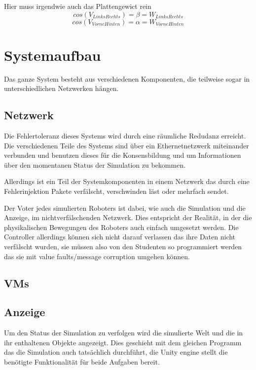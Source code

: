 \documentclass[
    12pt,
    bibliography=totoc,
    ngerman
]{scrartcl}
\begin{document}
Hier muss irgendwie auch das Plattengewict rein
$$ cos(V_{LinksRechts}) = \beta = W_{LinksRechts} $$
$$ cos(V_{VorneHinten}) = \alpha = W_{VorneHinten} $$

\clearpage
\section{Systemaufbau}
Das ganze System besteht aus verschiedenen Komponenten, die teilweise sogar in unterschiedlichen Netzwerken h{\"{a}}ngen. 

\subsection{Netzwerk}\label{network}
Die Fehlertoleranz dieses Systems wird durch eine r{\"{a}}umliche Redudanz erreicht. Die verschiedenen Teile des Systems sind {\"{u}}ber ein Ethernetnetzwerk miteinander verbunden und benutzen dieses
f{\"{u}}r die Konsensbildung und um Informationen {\"{u}}ber den momentanen Status der Simulation zu bekommen.

Allerdings ist ein Teil der Systemkomponenten in einem Netzwerk das durch eine Fehlerinjektion Pakete verf{\"{a}}lscht, verschwinden l{\"{a}}st oder mehrfach sendet. 

Der Voter jedes simulierten Roboters ist dabei, wie auch die Simulation und die Anzeige, im nichtverf{\"{a}}lschenden Netzwerk. Dies entspricht der Realit{\"{a}}t, in der die physikalischen Bewegungen
des Roboters auch einfach umgesetzt werden. Die Controller allerdings k{\"{o}}nnen sich nicht darauf verlassen das ihre Daten nicht verf{\"{a}}lscht wurden, sie m{\"{u}}ssen also von den Studenten so
programmiert werden das sie mit value faults/message corruption\cite{richling-ass} umgehen k{\"{o}}nnen.

\subsection{VMs}

\subsection{Anzeige}\label{graphics}
Um den Status der Simulation zu verfolgen wird die simulierte Welt und die in ihr enthaltenen Objekte angezeigt. Dies geschieht mit dem gleichen Programm das die Simulation auch tats{\"{a}}chlich
durchf{\"{u}}hrt, die Unity engine stellt die ben{\"{o}}tigte Funktionalit{\"{a}}t f{\"{u}}r beide Aufgaben bereit.
\end{document}
